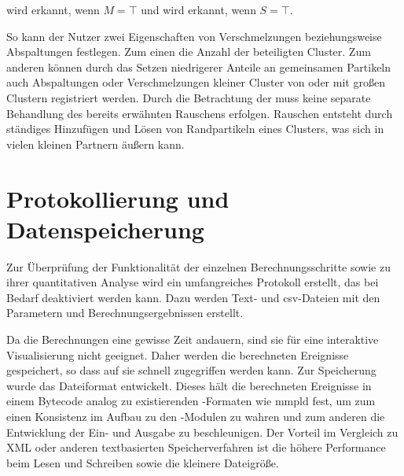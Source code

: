  wird erkannt, wenn $M = \top$ und  wird erkannt, wenn $S = \top$.

So kann der Nutzer zwei Eigenschaften von Verschmelzungen beziehungsweise Abspaltungen festlegen. Zum einen die Anzahl der beteiligten Cluster. Zum anderen können durch das Setzen niedrigerer Anteile an gemeinsamen Partikeln auch Abspaltungen oder Verschmelzungen kleiner Cluster von oder mit großen Clustern registriert werden. Durch die Betrachtung der  muss keine separate Behandlung des bereits erwähnten Rauschens erfolgen. Rauschen entsteht durch ständiges Hinzufügen und Lösen von Randpartikeln eines Clusters, was sich in vielen kleinen Partnern äußern kann.


\section{Protokollierung und Datenspeicherung}

Zur Überprüfung der Funktionalität der einzelnen Berechnungsschritte sowie zu ihrer quantitativen Analyse wird ein umfangreiches Protokoll erstellt, das bei Bedarf deaktiviert werden kann. Dazu werden Text- und \gls{csv}-Dateien mit den Parametern und Berechnungsergebnissen erstellt.

Da die Berechnungen eine gewisse Zeit andauern, sind sie für eine interaktive Visualisierung nicht geeignet. Daher werden die berechneten Ereignisse gespeichert, so dass auf sie schnell zugegriffen werden kann. Zur Speicherung wurde das Dateiformat \MMSE entwickelt. Dieses hält die berechneten Ereignisse in einem Bytecode analog zu existierenden -Formaten wie \gls{mmpld} fest, um zum einen Konsistenz im Aufbau zu den -Modulen zu wahren und zum anderen die Entwicklung der Ein- und Ausgabe zu beschleunigen. Der Vorteil im Vergleich zu \gls{XML} oder anderen textbasierten Speicherverfahren ist die höhere Performance beim Lesen und Schreiben sowie die kleinere Dateigröße.

